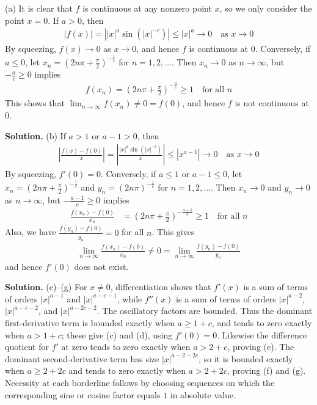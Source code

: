 \documentclass[12pt]{article}
\theoremstyle{definition}
\begin{document}
(a) It is clear that $f$ is continuous at any nonzero point $x$, so we only consider the point $x=0$. If $a>0$, then
\begin{align*}
\left\vert f(x)\right\vert
=\left\vert |x|^a\sin\left(\left\vert x\right\vert^{-c}\right)\right\vert
\le |x|^a
\to 0\quad\mbox{as }x\to 0
\end{align*}
By squeezing, $f(x)\to 0$ as $x\to 0$, and hence $f$ is continuous at $0$. Conversely, if $a\le 0$, let $x_n=\left(2n\pi+\frac{\pi}{2}\right)^{-\frac{1}{c}}$ for $n=1,2,\ldots$. Then $x_n\to 0$ as $n\to\infty$, but $-\frac{a}{c}\ge 0$ implies
\begin{align*}
f(x_n)=\left(2n\pi+\frac{\pi}{2}\right)^{-\frac{a}{c}}\ge 1\quad\mbox{for all }n
\end{align*}
This shows that $\lim_{n\to\infty}f(x_n)\ne 0=f(0)$, and hence $f$ is not continuous at $0$.

\smallskip
\noindent\textbf{Solution.}\quad
(b) If $a>1$ or $a-1>0$, then
\begin{align*}
\left\vert\frac{f(x)-f(0)}{x}\right\vert
=\left\vert\frac{|x|^a\sin\left(\left\vert x\right\vert^{-c}\right)}{x}\right\vert
\le\left\vert x^{a-1}\right\vert
\to 0\quad\mbox{as }x\to 0
\end{align*}
By squeezing, $f'(0)=0$. Conversely, if $a\le 1$ or $a-1\le 0$, let $x_n=\left(2n\pi+\frac{\pi}{2}\right)^{-\frac{1}{c}}$ and $y_n=(2n\pi)^{-\frac{1}{c}}$ for $n=1,2,\ldots$. Then $x_n\to 0$ and $y_n\to 0$ as $n\to\infty$, but $-\frac{a-1}{c}\ge 0$ implies
\begin{align*}
\frac{f(x_n)-f(0)}{x_n}
&=\left(2n\pi+\frac{\pi}{2}\right)^{-\frac{a-1}{c}}
\ge 1\quad\mbox{for all }n
\end{align*}
Also, we have $\frac{f(y_n)-f(0)}{y_n}=0$ for all $n$. This gives
\begin{align*}
\lim_{n\to\infty}\frac{f(x_n)-f(0)}{x_n}\ne 0=\lim_{n\to\infty}\frac{f(y_n)-f(0)}{y_n}
\end{align*}
and hence $f'(0)$ does not exist.

\smallskip
\noindent\textbf{Solution.}\quad
(c)--(g) For $x\ne0$, differentiation shows that $f'(x)$ is a sum of terms of orders $|x|^{a-1}$ and $|x|^{a-c-1}$, while $f''(x)$ is a sum of terms of orders $|x|^{a-2}$, $|x|^{a-c-2}$, and $|x|^{a-2c-2}$.  The oscillatory factors are bounded.  Thus the dominant first-derivative term is bounded exactly when $a\ge1+c$, and tends to zero exactly when $a>1+c$; these give (c) and (d), using $f'(0)=0$.  Likewise the difference quotient for $f'$ at zero tends to zero exactly when $a>2+c$, proving (e).  The dominant second-derivative term has size $|x|^{a-2-2c}$, so it is bounded exactly when $a\ge2+2c$ and tends to zero exactly when $a>2+2c$, proving (f) and (g).  Necessity at each borderline follows by choosing sequences on which the corresponding sine or cosine factor equals $1$ in absolute value.
\end{document}
